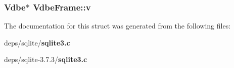 \subsubsection{\setlength{\rightskip}{0pt plus 5cm}\bf{Vdbe}$\ast$ \bf{Vdbe\-Frame::v}}\label{structVdbeFrame_a6fd1a7abd785f8d6dfd52662baee4a2}




The documentation for this struct was generated from the following files:\begin{CompactItemize}
\item 
deps/sqlite/\bf{sqlite3.c}\item 
deps/sqlite-3.7.3/\bf{sqlite3.c}\end{CompactItemize}
